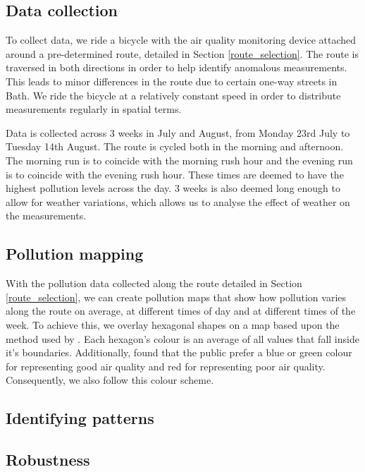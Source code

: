 \documentclass[11pt]{report}
\begin{document}
\subsection{Data collection}

To collect data, we ride a bicycle with the air quality monitoring device attached around a pre-determined route, detailed in Section \ref{route_selection}. The route is traversed in both directions in order to help identify anomalous measurements. This leads to minor differences in the route due to certain one-way streets in Bath. We ride the bicycle at a relatively constant speed in order to distribute measurements regularly in spatial terms.

Data is collected across 3 weeks in July and August, from Monday 23rd July to Tuesday 14th August. The route is cycled both in the morning and afternoon. The morning run is to coincide with the morning rush hour and the evening run is to coincide with the evening rush hour. These times are deemed to have the highest pollution levels across the day. 3 weeks is also deemed long enough to allow for weather variations, which allows us to analyse the effect of weather on the measurements.

\subsection{Pollution mapping}

With the pollution data collected along the route detailed in Section \ref{route_selection}, we can create pollution maps that show how pollution varies along the route on average, at different times of day and at different times of the week. To achieve this, we overlay hexagonal shapes on a map based upon the method used by \cite{Hoang2013hanoihexagons}. Each hexagon's colour is an average of all values that fall inside it's boundaries. Additionally, \cite{smallbone2012customerinsight} found that the public prefer a blue or green colour for representing good air quality and red for representing poor air quality. Consequently, we also follow this colour scheme.

\subsection{Identifying patterns}

\subsection{Robustness}
\end{document}
